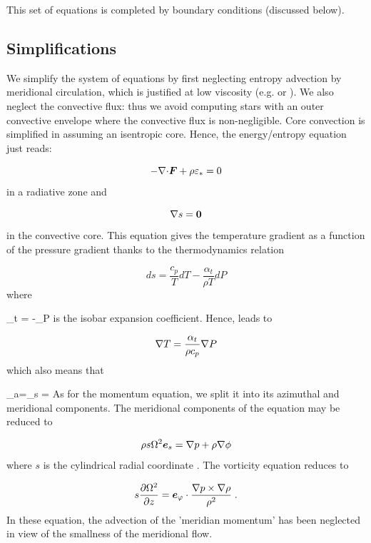 This set of equations is completed by boundary conditions (discussed
below).

\subsection{Simplifications}

We simplify the system of equations by first neglecting entropy
advection by meridional circulation, which is justified at low viscosity
(e.g. \href{http://arxiv.org/abs/astro-ph/0608431}{\citealt{R06b}} or
\citealt{RELP16}).
We also neglect the convective flux: thus we avoid computing stars
with an outer convective envelope where the convective flux is
non-negligible. Core convection is simplified in assuming an isentropic
core. Hence, the energy/entropy equation just reads:

\begin{equation} -\Div\vF + \rho\eps_* = 0\end{equation}
in a radiative zone and

\begin{equation} \na s ={\vec 0}\label{nas}\end{equation}
in the convective core. This equation gives the temperature gradient as a function
of the pressure gradient thanks to the thermodynamics relation

\[ ds = \frac{c_p}{T}dT - \frac{\alpha_t}{\rho T}dP\]
where 

\beq \alpha_t = -\lp{}\rp_{\!\!P}
is the isobar expansion coefficient. Hence,  leads to

\begin{equation} \na T = \frac{\alpha_t}{\rho c_p}\na P\end{equation}
which also means that

\beq \nabla_a=\lp{}\rp_{\!\!s} =
As for the momentum equation, we split it into its azimuthal and
meridional components. The meridional components of the equation may be
reduced to

\begin{equation}
\rho s\Omega^2\es=\na p+\rho\na\phi
\label{baroc}
\end{equation}
where $s$ is the cylindrical radial coordinate \cite[e.g.][hereafter
referred to as ELR]{ELR13}. The vorticity equation reduces to

\begin{equation}
\label{eq:vort_inv}
s\frac{\partial\Omega^2}{\partial z}=\ephi\cdot\frac{\na
p\times\na\rho}{\rho^2} \;.
\end{equation}
In these equation, the advection of the 'meridian momentum' has been
neglected in view of the smallness of the meridional flow.

